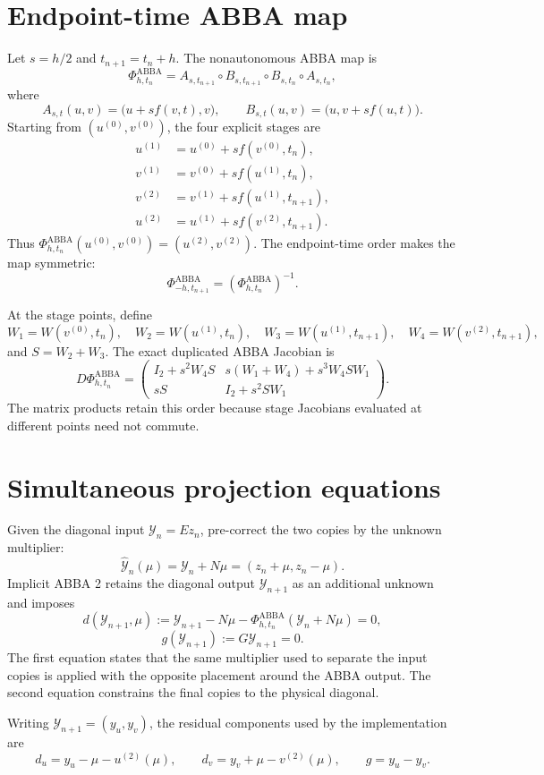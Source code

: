 \documentclass[11pt,a4paper]{article}
\newcommand{\Id}{I}
\newcommand{\Y}{\mathcal{Y}}
\newcommand{\PhiAB}{\Phi^{\mathrm{ABBA}}_{h,t_n}}
\begin{document}
\section{Endpoint-time ABBA map}

Let $s=h/2$ and $t_{n+1}=t_n+h$. The nonautonomous ABBA map is
\[
 \PhiAB
 =A_{s,t_{n+1}}\circ B_{s,t_{n+1}}
  \circ B_{s,t_n}\circ A_{s,t_n},
\]
where
\[
 A_{s,t}(u,v)=\bigl(u+s f(v,t),v\bigr),
 \qquad
 B_{s,t}(u,v)=\bigl(u,v+s f(u,t)\bigr).
\]
Starting from $(u^{(0)},v^{(0)})$, the four explicit stages are
\begin{align*}
 u^{(1)}&=u^{(0)}+s f(v^{(0)},t_n),\\
 v^{(1)}&=v^{(0)}+s f(u^{(1)},t_n),\\
 v^{(2)}&=v^{(1)}+s f(u^{(1)},t_{n+1}),\\
 u^{(2)}&=u^{(1)}+s f(v^{(2)},t_{n+1}).
\end{align*}
Thus $\PhiAB(u^{(0)},v^{(0)})=(u^{(2)},v^{(2)})$.
The endpoint-time order makes the map symmetric:
\[
 \Phi^{\mathrm{ABBA}}_{-h,t_{n+1}}
 =\left(\Phi^{\mathrm{ABBA}}_{h,t_n}\right)^{-1}.
\]

At the stage points, define
\[
 W_1=W(v^{(0)},t_n),\quad
 W_2=W(u^{(1)},t_n),\quad
 W_3=W(u^{(1)},t_{n+1}),\quad
 W_4=W(v^{(2)},t_{n+1}),
\]
and $S=W_2+W_3$. The exact duplicated ABBA Jacobian is
\[
 D\PhiAB=
 \begin{pmatrix}
  \Id_2+s^2W_4S
  &s(W_1+W_4)+s^3W_4SW_1\\[2mm]
  sS
  &\Id_2+s^2SW_1
 \end{pmatrix}.
\]
The matrix products retain this order because stage Jacobians evaluated at
different points need not commute.

\section{Simultaneous projection equations}

Given the diagonal input $\Y_n=Ez_n$, pre-correct the two copies by the
unknown multiplier:
\[
 \widehat{\Y}_n(\mu)=\Y_n+N\mu=(z_n+\mu,z_n-\mu).
\]
Implicit ABBA 2 retains the diagonal output $\Y_{n+1}$ as an additional
unknown and imposes
\[
 d(\Y_{n+1},\mu)
 :=\Y_{n+1}-N\mu
   -\PhiAB(\Y_n+N\mu)=0,
\]
\[
 g(\Y_{n+1}):=G\Y_{n+1}=0.
\]
The first equation states that the same multiplier used to separate the input
copies is applied with the opposite placement around the ABBA output. The second
equation constrains the final copies to the physical diagonal.

Writing $\Y_{n+1}=(y_u,y_v)$, the residual components used by the implementation are
\[
 d_u=y_u-\mu-u^{(2)}(\mu),
 \qquad
 d_v=y_v+\mu-v^{(2)}(\mu),
 \qquad
 g=y_u-y_v.
\]
\end{document}
